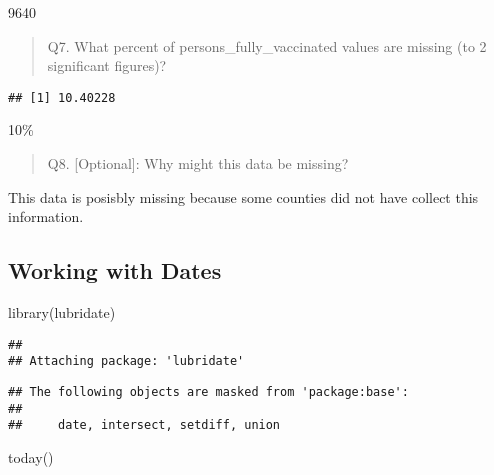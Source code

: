 \documentclass[
]{article}
\newenvironment{Shaded}{\begin{snugshade}}{\end{snugshade}}
\newcommand{\DecValTok}[1]{\textcolor[rgb]{0.00,0.00,0.81}{#1}}
\newcommand{\FunctionTok}[1]{\textcolor[rgb]{0.00,0.00,0.00}{#1}}
\newcommand{\NormalTok}[1]{#1}
\newcommand{\SpecialCharTok}[1]{\textcolor[rgb]{0.00,0.00,0.00}{#1}}
\begin{document}
9640

\begin{quote}
Q7. What percent of persons\_fully\_vaccinated values are missing (to 2
significant figures)?
\end{quote}

\begin{Shaded}
\end{Shaded}

\begin{verbatim}
## [1] 10.40228
\end{verbatim}

10\%

\begin{quote}
Q8. {[}Optional{]}: Why might this data be missing?
\end{quote}

This data is posisbly missing because some counties did not have collect
this information.

\hypertarget{working-with-dates}{%
\subsection{Working with Dates}\label{working-with-dates}}

\begin{Shaded}
\begin{Highlighting}[]
\FunctionTok{library}\NormalTok{(lubridate)}
\end{Highlighting}
\end{Shaded}

\begin{verbatim}
## 
## Attaching package: 'lubridate'
\end{verbatim}

\begin{verbatim}
## The following objects are masked from 'package:base':
## 
##     date, intersect, setdiff, union
\end{verbatim}

\begin{Shaded}
\begin{Highlighting}[]
\FunctionTok{today}\NormalTok{()}
\end{Highlighting}
\end{Shaded}
\end{document}

